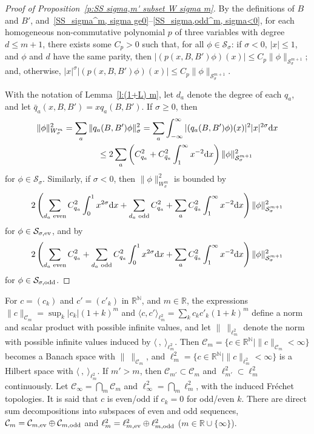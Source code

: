 \documentclass[11pt]{article}
\newcommand{\R}{\mathbb{R}}
\newcommand{\N}{\mathbb{N}}
\newcommand{\CC}{\mathcal{C}}
\renewcommand{\SS}{\mathcal{S}}
\begin{document}
\begin{proof}[Proof of Proposition~\ref{p:SS sigma,m' subset W sigma m}]
  By the def\/initions of $B$ and $B'$, and~\eqref{SS_sigma^m, sigma ge0}--\eqref{SS_sigma,odd^m, sigma<0}, for each homogeneous non-commutative polynomial $p$ of three variables with degree $d\le m+1$, there exists some $C_p>0$ such that, for all $\phi\in\SS_\sigma$: if $\sigma<0$, $|x|\le1$, and $\phi$ and $d$ have the same parity, then $|(p(x,B,B')\phi)(x)|\le C_p \|\phi\|_{\SS_\sigma^{m+1}}$; and, otherwise, $|x|^\sigma |(p(x,B,B')\phi)(x)|\le C_p \|\phi\|_{\SS_\sigma^{m+1}}$.

  With the notation of Lemma~\ref{l:(1+L) m}, let $d_a$ denote the degree of each $q_a$, and let $\bar q_a(x,B,B')=x q_a(B,B')$. If $\sigma\ge0$, then
    \begin{gather*}
      \|\phi\|_{W_\sigma^m}^2=\sum_a\|q_a(B,B')\phi\|_\sigma^2
      =\sum_a\int_{-\infty}^\infty|(q_a(B,B')\phi)(x)|^2 |x|^{2\sigma}{\rm d}x\\
\hphantom{\|\phi\|_{W_\sigma^m}^2=}{} \le 2\sum_a\left(C_{q_a}^2+C_{\bar q_a}^2\int_1^\infty x^{-2}{\rm d}x\right)\|\phi\|_{\SS_\sigma^{m+1}}^2
    \end{gather*}
for $\phi\in\SS_\sigma$. Similarly, if $\sigma<0$, then $\|\phi\|_{W_\sigma^m}^2$ is bounded by
    \[
      2\left(\sum_{\text{\rm$d_a$ even}}C_{q_a}^2\int_0^1x^{2\sigma}{\rm d}x
      +\sum_{\text{\rm$d_a$ odd}}C_{q_a}^2+\sum_aC_{\bar q_a}^2\int_1^\infty x^{-2}{\rm d}x\right)\|\phi\|_{\SS_\sigma^{m+1}}^2
    \]
   for $\phi\in\SS_{\sigma,\text{\rm ev}}$, and by
     \[
      2\left(\sum_{\text{\rm$d_a$ even}}C_{q_a}^2+\sum_{\text{\rm$d_a$ odd}}C_{q_a}^2\int_0^1x^{2\sigma}{\rm d}x
      +\sum_aC_{\bar q_a}^2\int_1^\infty x^{-2}{\rm d}x\right)\|\phi\|_{\SS_\sigma^{m+1}}^2
    \]
  for $\phi\in\SS_{\sigma,\text{\rm odd}}$.
\end{proof}

For $c=(c_k)$ and $c'=(c'_k)$ in $\R^{\N}$, and $m\in\R$, the expressions $\|c\|_{\CC_m}=\sup_k|c_k|(1+k)^m$ and $\langle c,c'\rangle_{\ell^2_m}=\sum_kc_kc'_k(1+k)^m$ def\/ine a norm and scalar product with possible inf\/inite values, and let $\|\ \|_{\ell^2_m}$ denote the norm with possible inf\/inite values induced by $\langle\ ,\ \rangle_{\ell^2_m}$. Then $\CC_m=\{c\in\R^{\N}\mid\|c\|_{\CC_m}<\infty\}$ becomes a Banach space with $\|\ \|_{\CC_m}$, and $\ell^2_m=\{c\in\R^{\N}\mid\|c\|_{\ell^2_m}<\infty\}$ is a Hilbert space with $\langle\ ,\ \rangle_{\ell^2_m}$. If $m'>m$, then $\CC_{m'}\subset\CC_m$ and $\ell^2_{m'}\subset\ell^2_m$ continuously. Let $\CC_\infty=\bigcap_m\CC_m$ and $\ell^2_\infty=\bigcap_m\ell^2_m$, with the induced Fr\'echet topologies. It is said that $c$ is even/odd if $c_k=0$ for odd/even $k$. There are direct sum decompositions into subspaces of even and odd sequences, $\CC_m=\CC_{m,\text{\rm ev}}\oplus\CC_{m,\text{\rm odd}}$ and $\ell^2_m=\ell^2_{m,\text{\rm ev}}\oplus\ell^2_{m,\text{\rm odd}}$ ($m\in\R\cup\{\infty\}$).
\end{document}
